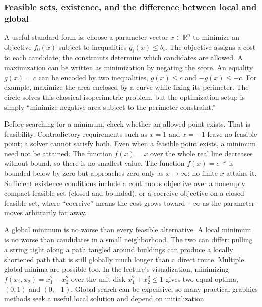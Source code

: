 \subsubsection{Feasible sets, existence, and the difference between local and global}\label{feasible-sets-existence-and-the-difference-between-local-and-global}

A useful standard form is: choose a parameter vector \(x\in\mathbb R^n\) to minimize an objective \(f_0(x)\) subject to inequalities \(g_i(x)\le b_i\). The objective assigns a cost to each candidate; the constraints determine which candidates are allowed. A maximization can be written as minimization by negating the score. An equality \(g(x)=c\) can be encoded by two inequalities, \(g(x)\le c\) and \(-g(x)\le -c\). For example, maximize the area enclosed by a curve while fixing its perimeter. The circle solves this classical isoperimetric problem, but the optimization setup is simply ``minimize negative area subject to the perimeter constraint.''

Before searching for a minimum, check whether an allowed point exists. That is feasibility. Contradictory requirements such as \(x=1\) and \(x=-1\) leave no feasible point; a solver cannot satisfy both. Even when a feasible point exists, a minimum need not be attained. The function \(f(x)=x\) over the whole real line decreases without bound, so there is no smallest value. The function \(f(x)=e^{-x}\) is bounded below by zero but approaches zero only as \(x\to\infty\); no finite \(x\) attains it. Sufficient existence conditions include a continuous objective over a nonempty compact feasible set (closed and bounded), or a coercive objective on a closed feasible set, where ``coercive'' means the cost grows toward \(+\infty\) as the parameter moves arbitrarily far away.

A global minimum is no worse than every feasible alternative. A local minimum is no worse than candidates in a small neighborhood. The two can differ: pulling a string tight along a path tangled around buildings can produce a locally shortened path that is still globally much longer than a direct route. Multiple global minima are possible too. In the lecture's visualization, minimizing \(f(x_1,x_2)=x_1^2-x_2^2\) over the unit disk \(x_1^2+x_2^2\le1\) gives two equal optima, \((0,1)\) and \((0,-1)\). Global search can be expensive, so many practical graphics methods seek a useful local solution and depend on initialization.

